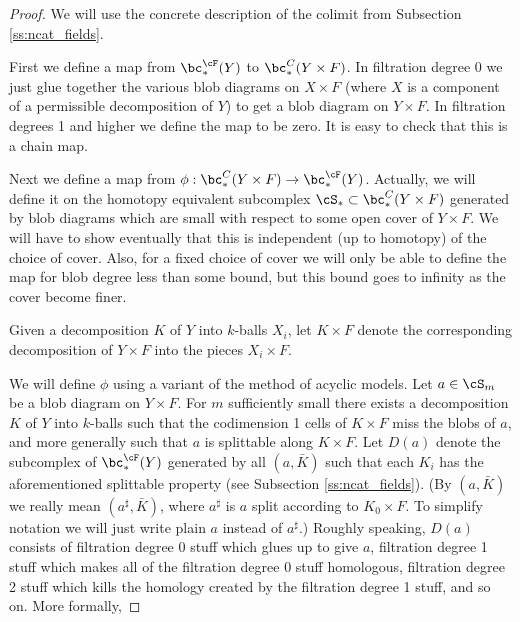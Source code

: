 \begin{proof}
We will use the concrete description of the colimit from Subsection \ref{ss:ncat_fields}.

First we define a map from $\bc_*^\cF(Y)$ to $\bc_*^C(Y\times F)$.
In filtration degree 0 we just glue together the various blob diagrams on $X\times F$
(where $X$ is a component of a permissible decomposition of $Y$) to get a blob diagram on
$Y\times F$.
In filtration degrees 1 and higher we define the map to be zero.
It is easy to check that this is a chain map.

Next we define a map from $\phi: \bc_*^C(Y\times F) \to \bc_*^\cF(Y)$.
Actually, we will define it on the homotopy equivalent subcomplex
$\cS_* \sub \bc_*^C(Y\times F)$ generated by blob diagrams which are small with 
respect to some open cover
of $Y\times F$.
We will have to show eventually that this is independent (up to homotopy) of the choice of cover.
Also, for a fixed choice of cover we will only be able to define the map for blob degree less than
some bound, but this bound goes to infinity as the cover become finer.

Given a decomposition $K$ of $Y$ into $k$-balls $X_i$, let $K\times F$ denote the corresponding
decomposition of $Y\times F$ into the pieces $X_i\times F$.


We will define $\phi$ using a variant of the method of acyclic models.
Let $a\in \cS_m$ be a blob diagram on $Y\times F$.
For $m$ sufficiently small there exists a decomposition $K$ of $Y$ into $k$-balls such that the
codimension 1 cells of $K\times F$ miss the blobs of $a$, and more generally such that $a$ is splittable along $K\times F$.
Let $D(a)$ denote the subcomplex of $\bc_*^\cF(Y)$ generated by all $(a, \bar{K})$
such that each $K_i$ has the aforementioned splittable property
(see Subsection \ref{ss:ncat_fields}).
(By $(a, \bar{K})$ we really mean $(a^\sharp, \bar{K})$, where $a^\sharp$ is 
$a$ split according to $K_0\times F$.
To simplify notation we will just write plain $a$ instead of $a^\sharp$.)
Roughly speaking, $D(a)$ consists of filtration degree 0 stuff which glues up to give
$a$, filtration degree 1 stuff which makes all of the filtration degree 0 stuff homologous, 
filtration degree 2 stuff which kills the homology created by the 
filtration degree 1 stuff, and so on.
More formally,
 

\end{proof}
